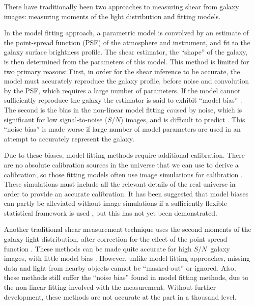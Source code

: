 \documentclass[iop]{emulateapj}
\newcommand{\snr}{$S/N$}
\begin{document}
There have traditionally been two approaches to measuring shear from
galaxy images: measuring moments of the light distribution and fitting models.

In the model fitting approach, a parametric model is convolved by an estimate
of the point-spread function (PSF) of the atmosphere and instrument, and fit to
the galaxy surface brightness profile.  The shear estimator, the ``shape'' of
the galaxy, is then determined from the parameters of this model.  This method
is limited for two primary reasons: First, in order for the shear inference to
be accurate, the model must accurately reproduce the galaxy profile, before
noise and convolution by the PSF, which requires a large number of parameters.
If the model cannot sufficiently reproduce the galaxy the estimator is said to
exhibit ``model bias'' \citep{Bernstein2010}.  The second is the bias in the
non-linear model fitting caused by noise, which is significant for low
signal-to-noise (\snr) images, and is difficult to predict
\citep{HirataAlign04,Refreg12,Melchior12}.  This ``noise bias'' is made worse
if large number of model parameters are used in an attempt to accurately
represent the galaxy.

Due to these biases, model fitting methods require additional calibration.
There are no absolute calibration sources in the universe that we can use to
derive a calibration, so those fitting models often use image simulations for
calibration \citep[e.g.][]{Zuntz13,Miller13,KidsShear2016,Refregier13,Jee16}.
These simulations must include all the relevant details of the real universe in
order to provide an accurate calibration.  It has been suggested that model
biases can partly be alleviated without image simulations if a sufficiently
flexible statistical framework is used \citep{SchneiderProbshear2015}, but
this has not yet been demonstrated.

Another traditional shear measurement technique uses the second moments of the
galaxy light distribution, after correction for the effect of the point spread
function \citep[e.g.][]{ksb95,Bernstein2010}.  These methods can be made quite
accurate for high \snr\ galaxy images, with little model bias
\citep{Bernstein2010,Okura2016}.  However, unlike model fitting approaches,
missing data and light from nearby objects cannot be ``masked-out'' or ignored.
Also, these methods still suffer the ``noise bias'' found in model fitting
methods, due to the non-linear fitting involved with the measurement.  Without
further development, these methods are not accurate at the part in a thousand
level.
\end{document}
